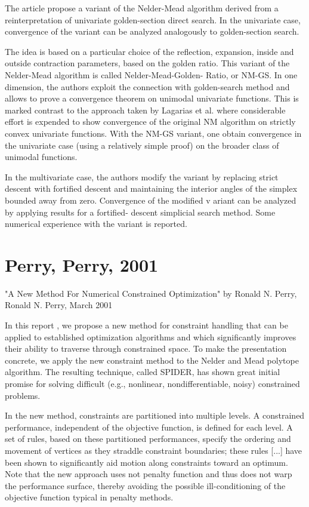 The article \cite{584536} propose a variant of the Nelder-Mead algorithm derived from 
a reinterpretation of univariate golden-section direct search. In the 
univariate case, convergence of the variant can be analyzed analogously 
to golden-section search. 

The idea is based on a particular choice of the reflection, expansion, 
inside and outside contraction parameters, based on the golden ratio. 
This variant of the Nelder-Mead algorithm is called Nelder-Mead-Golden-
Ratio, or NM-GS. In one dimension, the authors exploit the connection 
with golden-search method and allows to prove a convergence theorem on 
unimodal univariate functions. This is marked contrast to the approach 
taken by Lagarias et al. where considerable effort is expended to show 
convergence of the original NM algorithm on strictly convex univariate 
functions. With the NM-GS variant, one obtain convergence in the 
univariate case (using a relatively simple proof) on the broader class 
of unimodal functions. 

In the multivariate case, the authors modify the variant by replacing 
strict descent with fortified descent and maintaining the interior 
angles of the simplex bounded away from zero. Convergence of the 
modified v ariant can be analyzed by applying results for a fortified-
descent simplicial search method. Some numerical experience with the 
variant is reported.

\section{Perry, Perry, 2001}

"A New Method For Numerical Constrained Optimization"
by Ronald N. Perry, Ronald N. Perry,
March 2001

In this report \cite{Perry01anew}, we propose a new method for constraint 
handling that can be applied to established optimization algorithms and 
which significantly improves their ability to traverse through 
constrained space. To make the presentation concrete, we apply the new 
constraint method to the Nelder and Mead polytope algorithm. The 
resulting technique, called SPIDER, has shown great initial promise for 
solving difficult (e.g., nonlinear, nondifferentiable, noisy) 
constrained problems.

In the new method, constraints are partitioned into multiple
levels. A constrained performance, independent of the objective
function, is defined for each level. A set of rules, based on 
these partitioned performances, specify the ordering and 
movement of vertices as they straddle constraint boundaries;
these rules [...] have been shown to significantly aid motion along
constraints toward an optimum. Note that the new approach uses not 
penalty function and thus does not warp the performance surface,
thereby avoiding the possible ill-conditioning of the objective
function typical in penalty methods.

